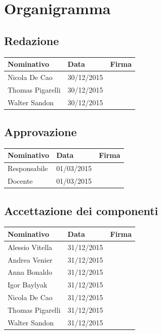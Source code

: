 \documentclass[12pt,a4paper]{article}
\begin{document}
\newpage

\appendix
\section{Organigramma}

\subsection{Redazione}

\begin{tabular}{| l | l | l |}
    \hline
    Nominativo & Data & Firma \\ \hline
    Nicola De Cao & 30/12/2015 & \\ \hline
    Thomas Pigarelli & 30/12/2015 & \\ \hline
    Walter Sandon & 30/12/2015 & \\ \hline
\end{tabular}


\subsection{Approvazione}

\begin{tabular}{| l | l | l |}
    \hline
    Nominativo & Data & Firma \\ \hline
    Responsabile & 01/03/2015 & \\ \hline
    Docente & 01/03/2015 & \\ \hline
\end{tabular}

\subsection{Accettazione dei componenti}

\begin{tabular}{| l | l | l |}
    \hline
    Nominativo & Data & Firma \\ \hline
    Alessio Vitella & 31/12/2015 & \\ \hline
    Andrea Venier & 31/12/2015 & \\ \hline
    Anna Bonaldo & 31/12/2015 & \\ \hline
    Igor Baylyak & 31/12/2015 & \\ \hline
    Nicola De Cao & 31/12/2015 & \\ \hline
    Thomas Pigarelli & 31/12/2015 & \\ \hline
    Walter Sandon & 31/12/2015 & \\ \hline
\end{tabular}
\end{document}
